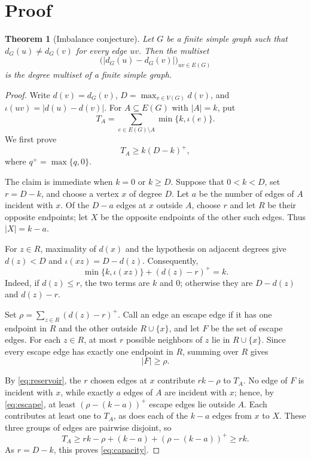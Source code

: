 \documentclass[11pt,reqno]{amsart}
\date{July 26, 2026}
\numberwithin{equation}{section}
\newtheorem{theorem}{Theorem}[section]
\begin{document}
\section{Proof}

\begin{theorem}[Imbalance conjecture]
Let $G$ be a finite simple graph such that $d_G(u)\ne d_G(v)$ for every
edge $uv$.  Then the multiset
\[
  \bigl(\lvert d_G(u)-d_G(v)\rvert\bigr)_{uv\in E(G)}
\]
is the degree multiset of a finite simple graph.
\end{theorem}

\begin{proof}
Write $d(v)=d_G(v)$, $D=\max_{v\in V(G)}d(v)$, and
$\iota(uv)=\lvert d(u)-d(v)\rvert$.  For $A\subseteq E(G)$ with
$\lvert A\rvert=k$, put
\[
  T_A=\sum_{e\in E(G)\setminus A}\min\{k,\iota(e)\}.
\]
We first prove
\begin{equation}\label{eq:capacity}
  T_A\ge k(D-k)^+,
\end{equation}
where $q^+=\max\{q,0\}$.

The claim is immediate when $k=0$ or $k\ge D$.  Suppose that
$0<k<D$, set $r=D-k$, and choose a vertex $x$ of degree $D$.  Let $a$
be the number of edges of $A$ incident with $x$.  Of the $D-a$ edges at
$x$ outside $A$, choose $r$ and let $R$ be their opposite endpoints; let
$X$ be the opposite endpoints of the other such edges.  Thus
$\lvert X\rvert=k-a$.

For $z\in R$, maximality of $d(x)$ and the hypothesis on adjacent
degrees give $d(z)<D$ and $\iota(xz)=D-d(z)$.  Consequently,
\begin{equation}\label{eq:reservoir}
  \min\{k,\iota(xz)\}+(d(z)-r)^+=k.
\end{equation}
Indeed, if $d(z)\le r$, the two terms are $k$ and $0$; otherwise they
are $D-d(z)$ and $d(z)-r$.

Set $\rho=\sum_{z\in R}(d(z)-r)^+$.  Call an edge an escape edge if it
has one endpoint in $R$ and the other outside $R\cup\{x\}$, and let $F$
be the set of escape edges.  For each $z\in R$, at most $r$ possible
neighbors of $z$ lie in $R\cup\{x\}$.  Since every escape edge has
exactly one endpoint in $R$, summing over $R$ gives
\begin{equation}\label{eq:escape}
  \lvert F\rvert\ge\rho.
\end{equation}

By \eqref{eq:reservoir}, the $r$ chosen edges at $x$ contribute
$rk-\rho$ to $T_A$.  No edge of $F$ is incident with $x$, while exactly
$a$ edges of $A$ are incident with $x$; hence, by \eqref{eq:escape}, at
least $(\rho-(k-a))^+$ escape edges lie outside $A$.  Each contributes at
least one to $T_A$, as does each of the $k-a$ edges from $x$ to $X$.
These three groups of edges are pairwise disjoint, so
\[
  T_A\ge rk-\rho+(k-a)+(\rho-(k-a))^+\ge rk.
\]
As $r=D-k$, this proves \eqref{eq:capacity}.


\end{proof}
\end{document}
